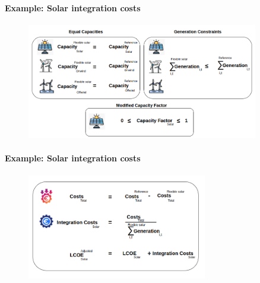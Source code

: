 \documentclass[aspectratio=169]{beamer}
\begin{document}
\begin{frame}{\insertsectionhead}
\framesubtitle{Example: Solar integration costs}
\begin{figure}
    \centering
    \includegraphics[width=0.9\textwidth]{cons.png}
  
  \end{figure}
\end{frame}

\begin{frame}{\insertsectionhead}
\framesubtitle{Example: Solar integration costs}
\begin{figure}
    \centering
    \includegraphics[width=0.7\textwidth]{metr.png}
  \end{figure}
\end{frame}
\end{document}
